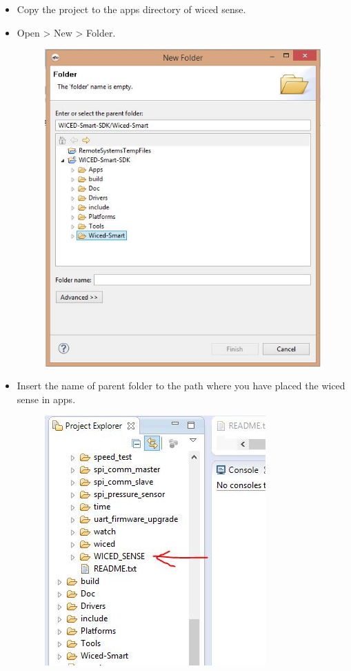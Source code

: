 \documentclass[11pt,a4paper]{article}
\begin{document}
  \begin{itemize}
 \item Copy the project to the apps directory of wiced sense.
 \item Open > New > Folder.
 \begin{figure}[h]
    \centering
	\includegraphics[scale=0.4]{newproj.JPG}
	\end{figure}
 \item Insert the name of parent folder to the path where you have placed the wiced sense in apps. 

	 \begin{figure}[h]
    \centering
	\includegraphics[scale=0.6]{wiced.JPG} 
	\end{figure}
	

\end{itemize}
\end{document}
